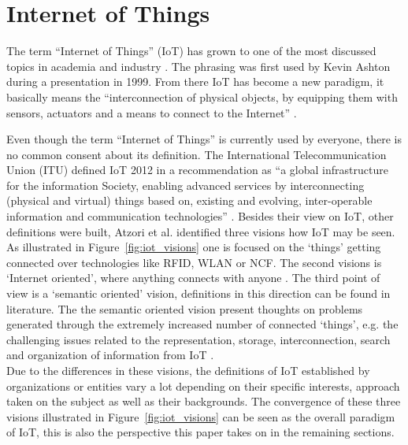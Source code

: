\section{Internet of Things}
\label{sec:iot}
	The term ``Internet of Things'' (IoT) has grown to one of the most discussed topics in academia and industry \cite{ju}. The phrasing was first used by Kevin Ashton during a presentation in 1999. From there IoT has become a new paradigm, it basically means the ``interconnection of physical objects, by equipping them with sensors, actuators and a means to connect to the Internet'' \cite{dijkman}.

	Even though the term ``Internet of Things'' is currently used by everyone, there is no common consent about its definition. The International Telecommunication Union (ITU) defined IoT 2012 in a recommendation as ``a global infrastructure for the information Society, enabling advanced services by interconnecting (physical and virtual) things based on, existing and evolving, inter-operable information and communication technologies'' \cite{itu}. Besides their view on IoT, other definitions were built, Atzori et al. identified three visions how IoT may be seen. As illustrated in Figure~\ref{fig:iot_visions} one is focused on the `things' getting connected over technologies like RFID, WLAN or NCF. The second visions is `Internet oriented', where anything connects with anyone . The third point of view is a `semantic oriented' vision, definitions in this direction can be found in literature. The the semantic oriented vision present thoughts on problems generated through the extremely increased number of connected `things', e.g. the challenging issues related to the representation, storage, interconnection, search and organization of information from IoT \cite{atzori}.\\
	Due to the differences in these visions, the definitions of IoT established by organizations or entities vary a lot depending on their specific interests, approach taken on the subject as well as their backgrounds. The convergence of these three visions illustrated in Figure~\ref{fig:iot_visions} can be seen as the overall paradigm of IoT, this is also the perspective this paper takes  on in the remaining sections. 
